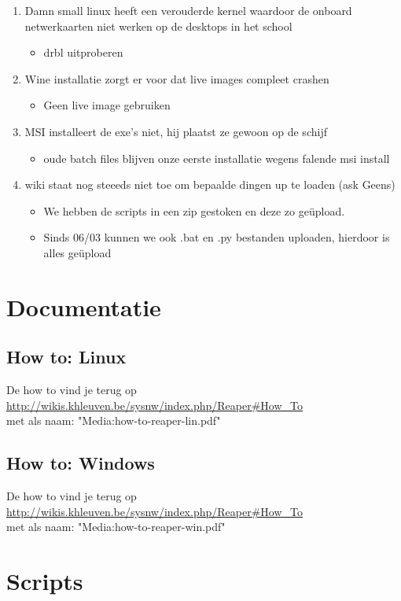 \documentclass[DIV=calc]{scrartcl}
\begin{document}
\begin{enumerate}
\begin{itemize}
	\end{itemize}
	\item Damn small linux heeft een verouderde kernel waardoor de onboard netwerkaarten niet werken op de desktops in het school
	\begin{itemize}
		\item drbl uitproberen
	\end{itemize}
	\item Wine installatie zorgt er voor dat live images compleet crashen
	\begin{itemize}
		\item Geen live image gebruiken
	\end{itemize}
	\item MSI installeert de exe's niet, hij plaatst ze gewoon op de schijf
	\begin{itemize}
		\item oude batch files blijven onze eerste installatie wegens falende msi install
	\end{itemize}
	\item wiki staat nog steeeds niet toe om bepaalde dingen up te loaden (ask Geens)
	\begin{itemize}
		\item We hebben de scripts in een zip gestoken en deze zo ge\"upload.
		\item Sinds 06/03 kunnen we ook .bat en .py bestanden uploaden, hierdoor is alles ge\"upload
	\end{itemize}
\end{enumerate}
\section{Documentatie}
\subsection{How to: Linux}
De how to vind je terug op \\
\url{http://wikis.khleuven.be/sysnw/index.php/Reaper#How_To} \\met als naam: "Media:how-to-reaper-lin.pdf"
\subsection{How to: Windows}
De how to vind je terug op \\
\url{http://wikis.khleuven.be/sysnw/index.php/Reaper#How_To} \\met als naam: "Media:how-to-reaper-win.pdf"
\pagebreak
\section{Scripts}
\end{document}
